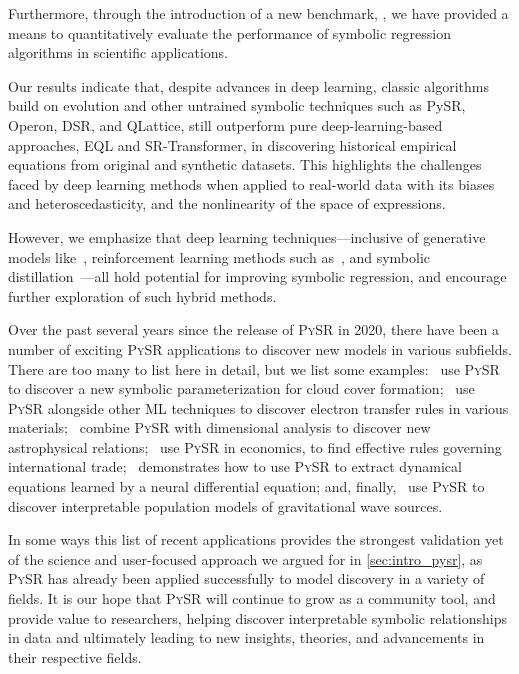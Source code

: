 \documentclass[letterpaper,twocolumn]{scrartcl}
\newcommand\pysr{\textsc{PySR}\xspace}
\begin{document}
Furthermore, through the introduction of a new benchmark, \bench, we have provided a means to quantitatively evaluate the performance of symbolic regression algorithms in scientific applications.

Our results indicate that, despite advances in deep learning, classic algorithms build on evolution and other untrained symbolic techniques such as PySR, Operon, DSR, and QLattice, still outperform pure deep-learning-based approaches, EQL and SR-Transformer, in discovering historical empirical equations from original and synthetic datasets.
This highlights the challenges faced by deep learning methods when applied to real-world data with its biases and heteroscedasticity, and the nonlinearity of the space of expressions.

However, we emphasize that deep learning techniques---inclusive of generative models like~\cite{kamiennyEndtoendSymbolicRegression2022}, reinforcement learning methods such as~\cite{petersenDeepSymbolicRegression2021}, and symbolic distillation~\cite{cranmerDiscoveringSymbolicModels2020}---all hold potential for improving symbolic regression, and encourage further exploration of such hybrid methods.

Over the past several years since the release of \pysr in 2020, there have been a number of exciting \pysr applications to discover new models in various subfields. There are too many to list here in detail, but we list some examples:~\cite{grundnerDataDrivenEquationDiscovery2023} use \pysr to discover a new symbolic parameterization for cloud cover formation;~\cite{liElectronTransferRules2023} use \pysr alongside other ML techniques to discover electron transfer rules in various materials;~\cite{matchevAnalyticalModelingExoplanet2022,wadekarSZFluxmassYM2022,wadekarAugmentingAstrophysicalScaling2022} combine \pysr with dimensional analysis to discover new astrophysical relations;~\cite{verstyukMachineLearningGravity2022} use \pysr in economics, to find effective rules governing international trade;~\cite{kidgerNeuralDifferentialEquations2022} demonstrates how to use \pysr to extract dynamical equations learned by a neural differential equation; and, finally,~\cite{wongAutomatedDiscoveryInterpretable2022} use \pysr to discover interpretable population models of gravitational wave sources.


In some ways this list of recent applications provides the strongest validation yet of the science and user-focused approach we argued for in \cref{sec:intro_pysr}, as \pysr has already been applied successfully to model discovery in a variety of fields.
It is our hope that \pysr will continue to grow as a community tool, and provide value to researchers, helping discover interpretable symbolic relationships in data and ultimately leading to new insights, theories, and advancements in their respective fields.
\end{document}
